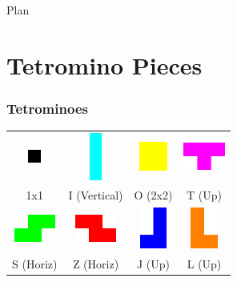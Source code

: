 \documentclass[9pt,table,xcolor=dvipsnames]{beamer}
\begin{document}
\begin{frame}{Plan} %
 \tableofcontents
\end{frame}
\section{Tetromino Pieces}
\begin{frame} %
  \frametitle{Tetrominoes}

  \begin{center}
    \renewcommand{\arraystretch}{1.2}
    \begin{tabular}{cccc}
      \includegraphics[height=0.425cm]{tetromino/Tetromino_1x1_Single.png} &
      \includegraphics[height=1.55cm]{tetromino/Tetromino_I_Vertical.png} &
      \includegraphics[height=0.95cm]{tetromino/Tetromino_O_Single.png} &
      \includegraphics[height=0.90cm]{tetromino/Tetromino_T_Up.png} \\
      {\small 1x1} & {\small I (Vertical)} & {\small O (2x2)} & {\small T (Up)} \\
      \includegraphics[height=0.90cm]{tetromino/Tetromino_S_Horizontal.png} &
      \includegraphics[height=0.90cm]{tetromino/Tetromino_Z_Horizontal.png} &
      \includegraphics[height=1.35cm]{tetromino/Tetromino_J_Up.png} &
      \includegraphics[height=1.35cm]{tetromino/Tetromino_L_Up.png} \\
      {\small S (Horiz)} & {\small Z (Horiz)} & {\small J (Up)} & {\small L (Up)} \\
    \end{tabular}
  \end{center}


\end{frame}
\end{document}
